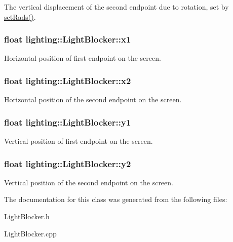 The vertical displacement of the second endpoint due to rotation, set by \hyperlink{classlighting_1_1LightBlocker_a1fe1c13013aeee813526ae74cd5a984c}{set\+Rads()}. 

\subsubsection[{\texorpdfstring{x1}{x1}}]{\setlength{\rightskip}{0pt plus 5cm}float lighting\+::\+Light\+Blocker\+::x1}\hypertarget{classlighting_1_1LightBlocker_acb89235bf9b478b8242e0bf3a1ca863c}{}\label{classlighting_1_1LightBlocker_acb89235bf9b478b8242e0bf3a1ca863c}


Horizontal position of first endpoint on the screen. 

\subsubsection[{\texorpdfstring{x2}{x2}}]{\setlength{\rightskip}{0pt plus 5cm}float lighting\+::\+Light\+Blocker\+::x2}\hypertarget{classlighting_1_1LightBlocker_aaeb1641f4d28d66c4d89045c6053a29a}{}\label{classlighting_1_1LightBlocker_aaeb1641f4d28d66c4d89045c6053a29a}


Horizontal position of the second endpoint on the screen. 

\subsubsection[{\texorpdfstring{y1}{y1}}]{\setlength{\rightskip}{0pt plus 5cm}float lighting\+::\+Light\+Blocker\+::y1}\hypertarget{classlighting_1_1LightBlocker_ad988b4727c60d6e83a8fca2d7eabbdec}{}\label{classlighting_1_1LightBlocker_ad988b4727c60d6e83a8fca2d7eabbdec}


Vertical position of first endpoint on the screen. 

\subsubsection[{\texorpdfstring{y2}{y2}}]{\setlength{\rightskip}{0pt plus 5cm}float lighting\+::\+Light\+Blocker\+::y2}\hypertarget{classlighting_1_1LightBlocker_a69fdb1256cab66b415a76b9f63af4284}{}\label{classlighting_1_1LightBlocker_a69fdb1256cab66b415a76b9f63af4284}


Vertical position of the second endpoint on the screen. 



The documentation for this class was generated from the following files\+:\begin{DoxyCompactItemize}
\item 
Light\+Blocker.\+h\item 
Light\+Blocker.\+cpp\end{DoxyCompactItemize}
